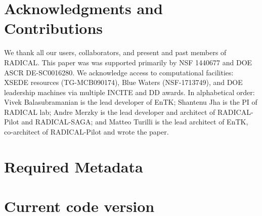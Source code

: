 \documentclass[preprint,12pt, a4paper]{elsarticle}
\begin{document}
\section*{Acknowledgments and Contributions}

We thank all our users, collaborators, and present and past members of
RADICAL\@. This paper was was supported primarily by NSF 1440677 and DOE ASCR
DE-SC0016280. We acknowledge access to computational facilities: XSEDE
resources (TG-MCB090174), Blue Waters (NSF-1713749), and DOE leadership
machines via multiple INCITE and DD awards. In alphabetical order: Vivek
Balasubramanian is the lead developer of EnTK\@; Shantenu Jha is the PI of
RADICAL lab; Andre Merzky is the lead developer and architect of
RADICAL-Pilot and RADICAL-SAGA\@; and Matteo Turilli is the lead architect of
EnTK, co-architect of RADICAL-Pilot and wrote the paper.

 



\appendix


\section*{Required Metadata}\label{sec:metadata}


\section*{Current code version}\label{sec:src_version}

\end{document}
